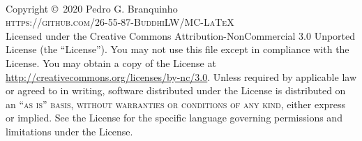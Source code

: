\documentclass[12pt,
brazilian,
a5paper]{abntex2} %
\begin{document}

\begingroup
\thispagestyle{empty} %
\vfill
\endgroup



\newpage
~\vfill
\thispagestyle{empty}

\noindent Copyright \copyright\ 2020 Pedro G. Branquinho\\ %


\noindent \textsc{https://github.com/26-55-87-BuddhiLW/MC-LaTeX}\\ %

\noindent Licensed under the Creative Commons Attribution-NonCommercial 3.0 Unported License (the ``License''). You may not use this file except in compliance with the License. You may obtain a copy of the License at \url{http://creativecommons.org/licenses/by-nc/3.0}. Unless required by applicable law or agreed to in writing, software distributed under the License is distributed on an \textsc{``as is'' basis, without warranties or conditions of any kind}, either express or implied. See the License for the specific language governing permissions and limitations under the License.\\ %
\end{document}
